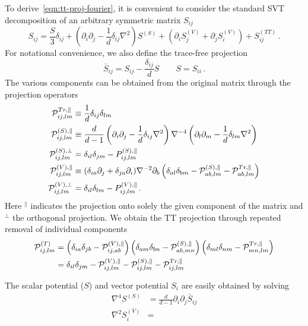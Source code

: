 \documentclass{revtex4}
\begin{document}
To derive~\eqref{eqn:tt-proj-fourier}, it is convenient to consider the standard SVT decomposition of an arbitrary symmetric matrix $S_{ij}$
\begin{equation}
  S_{ij} = \frac{S}{3}\delta_{ij} + \left(\partial_i\partial_j - \frac{1}{d}\delta_{ij}\nabla^2\right)S^{(S)} + (\partial_iS_j^{(V)} + \partial_jS^{(V)}_i) + S_{ij}^{(TT)} \, .
\end{equation}
For notational convenience, we also define the trace-free projection
\begin{equation}
  \bar{S}_{ij} = S_{ij} - \frac{\delta_{ij}}{d}S \qquad S = S_{ii} \, .
\end{equation}
The various components can be obtained from the original matrix through the projection operators
\begin{subequations}
\begin{align}
  \mathcal{P}^{Tr,\parallel}_{ij,lm} &\equiv \frac{1}{d}\delta_{ij}\delta_{lm} \\
  \mathcal{P}^{(S),\parallel}_{ij,lm} &\equiv \frac{d}{d-1}\left(\partial_i\partial_j - \frac{1}{d}\delta_{ij}\nabla^2\right)\nabla^{-4}\left(\partial_l\partial_m - \frac{1}{d}\delta_{lm}\nabla^2\right) \\
  \mathcal{P}^{(S),\perp}_{ij,lm} &= \delta_{il}\delta_{jm} - P^{(S),\parallel}_{ij,lm} \\
  \mathcal{P}^{(V),\parallel}_{ij,lm} &\equiv (\delta_{ia}\partial_j + \delta_{ja}\partial_i)\nabla^{-2}\partial_b\left(\delta_{al}\delta_{bm} - \mathcal{P}^{(S),\parallel}_{ab,lm} - \mathcal{P}^{Tr,\parallel}_{ab,lm}\right) \\
  \mathcal{P}^{(V),\perp}_{ij,lm} &= \delta_{il}\delta_{lm} - P_{ij,lm}^{(V),\parallel} \, .
\end{align}
\end{subequations}
Here ${}^\parallel$ indicates the projection onto solely the given component of the matrix and ${}^{\perp}$ the orthogonal projection.
We obtain the TT projection through repeated removal of individual components
\begin{align}
  \mathcal{P}_{ij,lm}^{(T)} &= \left(\delta_{ia}\delta_{jb} - \mathcal{P}^{(V),\parallel}_{ij,ab}\right)\left(\delta_{am}\delta_{bn}-\mathcal{P}_{ab,mn}^{(S),\parallel}\right)\left(\delta_{ml}\delta_{nm}-\mathcal{P}_{mn,lm}^{Tr,\parallel}\right) \\
  &=  \delta_{il}\delta_{jm} - \mathcal{P}_{ij,lm}^{(V),\parallel} - \mathcal{P}_{ij,lm}^{(S),\parallel} - \mathcal{P}_{ij,lm}^{Tr,\parallel}
\end{align}

The scalar potential ($S$) and vector potential $S_i$ are easily obtained by solving
\begin{subequations}
  \begin{align}
    \nabla^4 S^{(S)} &= \frac{d}{d-1}\partial_i\partial_j\bar{S}_{ij} \\
    \nabla^2 S_i^{(V)} &=
  \end{align}
\end{subequations}
\end{document}

